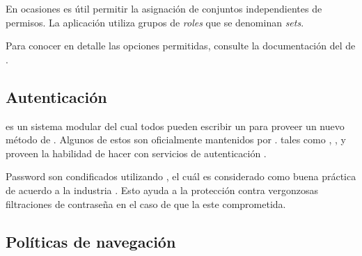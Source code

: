 En ocasiones es útil permitir la asignación de conjuntos independientes de permisos. La aplicación utiliza grupos de \textit{roles} que se denominan \textit{sets}.

Para conocer en detalle las opciones permitidas, consulte la documentación del \packageAS  de \meteorNAME \alanningRolesPackage.


\subsection{Autenticación}

\meteorAccountNAME es un sistema modular del cual todos pueden escribir un \packageAS para proveer un nuevo método de \loginCPT. Algunos de estos \packageAS son oficialmente mantenidos por \meteorProyectNAME. \packageAS tales como \accountGoogle, \accountFacebook, y \accountTwitter proveen la habilidad de hacer \loginCPT con servicios de autenticación \thirdParty.

Password son condificados utilizando \bcriptCPT, el cuál es considerado como buena práctica de acuerdo a la industria \cite{online_meteor_accounts}. Esto ayuda a la protección contra vergonzosas filtraciones de contraseña en el caso de que la \dataBasesDB este comprometida.



\subsection{Políticas de navegación}

